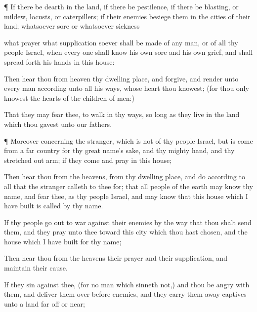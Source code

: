 {\par }{\PP {}¶ If there be
dearth in the
land, if there be
pestilence, if there be
blasting, or
mildew,
locusts, or
caterpillers; if their
enemies
besiege them in the
cities of their
land; whatsoever
sore or whatsoever
sickness
{}

 what
prayer
{} what
supplication soever shall be made of any
man, or of all thy
people
Israel, when every
one shall
know his own
sore and his own
grief, and shall spread
forth his
hands in this
house:

Then
hear thou from
heaven thy
dwelling
place, and
forgive, and
render unto every
man according unto all his
ways, whose
heart thou
knowest; (for thou only
knowest the
hearts of the
children of
men:)

That they may
fear thee, to
walk in thy
ways, so long
as they
live in the
land which thou
gavest unto our
fathers.


\par }{\PP {}¶ Moreover concerning the
stranger, which is not of thy
people
Israel, but is
come from a
far
country for thy
great
name’s sake, and thy
mighty
hand, and thy stretched
out
arm; if they
come and
pray in this
house;

Then
hear thou from the
heavens,
{} from thy
dwelling
place, and
do according to all that the
stranger
calleth to thee for; that all
people of the
earth may
know thy
name, and
fear thee, as
{} thy
people
Israel, and may
know that this
house which I have
built is
called by thy
name.

If thy
people go
out to
war against their
enemies by the
way that thou shalt
send them, and they
pray unto thee
toward this
city which thou hast
chosen, and the
house which I have
built for thy
name;

Then
hear thou from the
heavens their
prayer and their
supplication, and
maintain their
cause.

If they
sin against thee, (for
{} no
man which
sinneth not,) and thou be
angry with them, and
deliver them over
before
{}
enemies, and they carry them
away
captives unto a
land far
off or
near;

}
